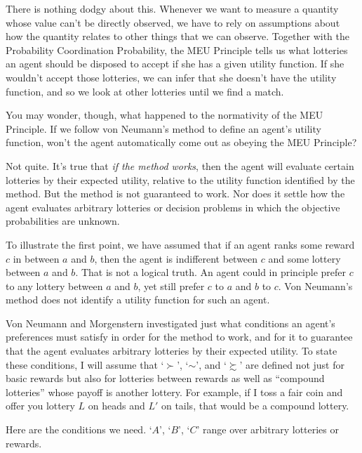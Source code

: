 There is nothing dodgy about this. Whenever we want to measure a
quantity whose value can't be directly observed, we have to rely on
assumptions about how the quantity relates to other things that we can
observe. Together with the Probability Coordination Probability, the
MEU Principle tells us what lotteries an agent should be disposed to
accept if she has a given utility function. If she wouldn't accept
those lotteries, we can infer that she doesn't have the utility
function, and so we look at other lotteries until we find a match.

You may wonder, though, what happened to the normativity of the MEU
Principle. If we follow von Neumann's method to define an agent's
utility function, won't the agent automatically come out as obeying
the MEU Principle?

Not quite. It's true that \emph{if the method works}, then the agent will
evaluate certain lotteries by their expected utility, relative to the utility
function identified by the method. But the method is not guaranteed to work. Nor
does it settle how the agent evaluates arbitrary lotteries or decision problems
in which the objective probabilities are unknown.

To illustrate the first point, we have assumed that if an agent ranks
some reward $c$ in between $a$ and $b$, then the agent is indifferent
between $c$ and some lottery between $a$ and $b$. That is not a
logical truth. An agent could in principle prefer $c$ to any lottery
between $a$ and $b$, yet still prefer $c$ to $a$ and $b$ to $c$. Von
Neumann's method does not identify a utility function for such an
agent.

Von Neumann and Morgenstern investigated just what conditions an
agent's preferences must satisfy in order for the method to work, and
for it to guarantee that the agent evaluates arbitrary lotteries by
their expected utility. To state these conditions, I will assume that
`$\succ$', `$\sim$', and `$\succsim$' are defined not just for basic
rewards but also for lotteries between rewards as well as ``compound
lotteries'' whose payoff is another lottery. For example, if I toss a
fair coin and offer you lottery $L$ on heads and $L'$ on tails, that
would be a compound lottery.

Here are the conditions we need. `$A$', `$B$', `$C$' range over
arbitrary lotteries or rewards.

